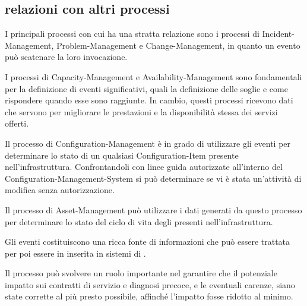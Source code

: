 \subsection[Relazioni con altri processi]{relazioni con altri processi}
\label{prc-event-relationship}
I principali processi con cui ha una stratta relazione sono i processi di \acf{Incident-Management}, \acf{Problem-Management} e \acf{Change-Management}, in quanto un evento può scatenare la loro invocazione.

I processi di \acf{Capacity-Management} e \acf{Availability-Management} sono fondamentali per la definizione di eventi significativi, quali la definizione delle soglie e come rispondere quando esse sono raggiunte. In cambio, questi processi ricevono dati che servono per migliorare le prestazioni e la disponibilità stessa dei servizi offerti.

Il processo di \acf{Configuration-Management} è in grado di utilizzare gli eventi per determinare lo stato di un qualsiasi \ac{Configuration-Item} presente nell'infrastruttura. Confrontandoli con linee guida autorizzate all'interno del \ac{Configuration-Management-System} si può determinare se vi è stata un'attività di modifica senza autorizzazione.

Il processo di \acf{Asset-Management} può utilizzare i dati generati da questo processo per determinare lo stato del ciclo di vita degli  presenti nell'infrastruttura.

Gli eventi costituiscono una ricca fonte di informazioni che può essere trattata per poi essere in inserita in sistemi di .

Il processo può svolvere un ruolo importante nel garantire che il potenziale impatto sui contratti di servizio e diagnosi precoce, e le eventuali carenze, siano state corrette al più presto possibile, affinché l'impatto fosse ridotto al minimo.